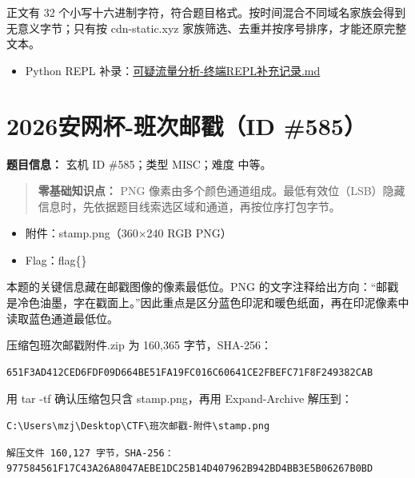 正文有 32 个小写十六进制字符，符合题目格式。按时间混合不同域名家族会得到无意义字节；只有按 cdn-static.xyz 家族筛选、去重并按序号排序，才能还原完整文本。

\begin{itemize}
\tightlist
\item
  Python REPL 补录：\href{../记录/题目记录/杂项与数字取证/584_可疑流量分析/原始分件/可疑流量分析-终端REPL补充记录.md}{可疑流量分析-终端REPL补充记录.md}
\end{itemize}

\section{2026安网杯-班次邮戳（ID \#585）}\label{ux5b89ux7f51ux676f-ux73edux6b21ux90aeux6233id-585}

\textbf{题目信息：} 玄机 ID \#585；类型 MISC；难度 中等。

\begin{quote}
\textbf{零基础知识点：} PNG 像素由多个颜色通道组成。最低有效位（LSB）隐藏信息时，先依据题目线索选区域和通道，再按位序打包字节。
\end{quote}

\begin{itemize}
\item
  附件：stamp.png（360×240 RGB PNG）
\item
  Flag：flag\{\}
\end{itemize}

本题的关键信息藏在邮戳图像的像素最低位。PNG 的文字注释给出方向：``邮戳是冷色油墨，字在戳面上。''因此重点是区分蓝色印泥和暖色纸面，再在印泥像素中读取蓝色通道最低位。

压缩包班次邮戳附件.zip 为 160,365 字节，SHA-256：

\begin{verbatim}
651F3AD412CED6FDF09D664BE51FA19FC016C60641CE2FBEFC71F8F249382CAB
\end{verbatim}

用 tar -tf 确认压缩包只含 stamp.png，再用 Expand-Archive 解压到：

\begin{verbatim}
C:\Users\mzj\Desktop\CTF\班次邮戳-附件\stamp.png
\end{verbatim}

\begin{verbatim}
解压文件 160,127 字节，SHA-256：977584561F17C43A26A8047AEBE1DC25B14D407962B942BD4BB3E5B06267B0BD
\end{verbatim}


